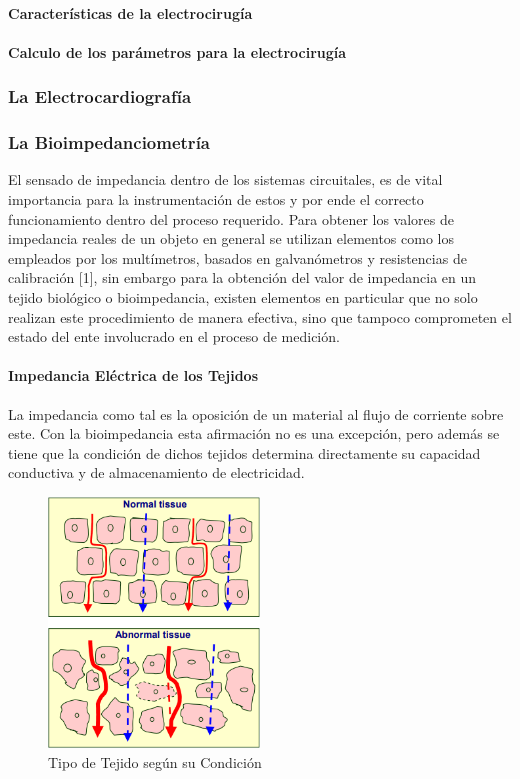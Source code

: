 \documentclass[12pt,letterpaper,spanish]{article}
\begin{document}
				\paragraph{Características de la electrocirugía}
				\paragraph{Calculo de los parámetros para la electrocirugía}
			\subsubsection{La Electrocardiografía}
			\subsubsection{La Bioimpedanciometría}
			El sensado de impedancia dentro de los sistemas circuitales, es de vital importancia para la 	instrumentación de estos y por ende el correcto funcionamiento dentro del proceso requerido. Para obtener los valores de impedancia reales de un objeto en general se utilizan elementos como los empleados por los multímetros, basados en galvanómetros y resistencias de calibración [1], sin embargo para la obtención del valor de impedancia en un tejido biológico o bioimpedancia, existen elementos en particular que no solo realizan este procedimiento de manera efectiva, sino que tampoco comprometen el estado del ente involucrado en el proceso de medición.
			
				\paragraph{Impedancia Eléctrica de los Tejidos}
				\hfill\break
				La impedancia como tal  es la oposición de un material al flujo de corriente sobre este. Con la bioimpedancia esta afirmación no es una excepción, pero además se tiene que la condición de dichos tejidos determina directamente su capacidad conductiva y de almacenamiento de electricidad.
			
				\begin{figure}[H]
					\centering
					\includegraphics[width=0.5\textwidth]{./Imagenes/Tejido.png}
					\caption{Tipo de Tejido según su Condición}
				\end{figure}
			
\end{document}
